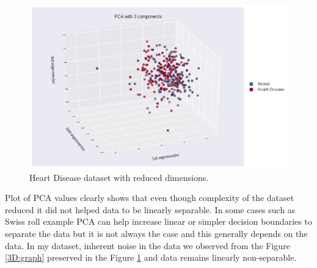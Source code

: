 \documentclass[12pt]{article}
\begin{document}
\begin{figure}[H]
    \centering
    \includegraphics[width=\textwidth]{img/pca.png}
    \caption{Heart Disease dataset with reduced dimensions.}
    \label{pca:graph}
\end{figure}

Plot of PCA values clearly shows that even though complexity of the dataset reduced it did not helped data to be linearly separable. In some cases such as Swiss roll example\cite{Gron:2017:HML:3153997} PCA can help increase linear or simpler decision boundaries to separate the data but it is not always the case and this generally depends on the data. In my dataset, inherent noise in the data we observed from the Figure \ref{3D:graph} preserved in the Figure \ref{pca:graph} and data remains linearly non-separable.


\printbibliography
\end{document}
